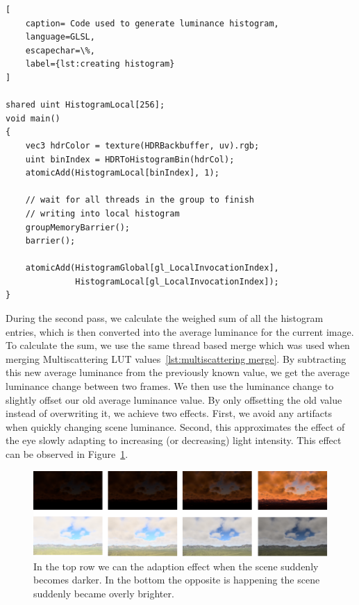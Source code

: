 \documentclass{ctuthesis}
\begin{document}
\begin{lstlisting}[ 
    caption= Code used to generate luminance histogram,
    language=GLSL,
    escapechar=\%,
    label={lst:creating histogram}
]

shared uint HistogramLocal[256];
void main()
{
    vec3 hdrColor = texture(HDRBackbuffer, uv).rgb;
    uint binIndex = HDRToHistogramBin(hdrCol);
    atomicAdd(HistogramLocal[binIndex], 1);

    // wait for all threads in the group to finish 
    // writing into local histogram
    groupMemoryBarrier();
    barrier();

    atomicAdd(HistogramGlobal[gl_LocalInvocationIndex],
              HistogramLocal[gl_LocalInvocationIndex]);
}
\end{lstlisting}

During the second pass, we calculate the weighed sum of all the histogram entries, which is then converted into 
the average luminance for the current image. To calculate the sum, we use the same thread based merge which 
was used when merging Multiscattering LUT values~\ref{lst:multiscattering merge}. By subtracting this new
average luminance from the previously known value, we get the average luminance change between two frames.
We then use the luminance change to slightly offset our old average luminance value. By only offsetting 
the old value instead of overwriting it, we achieve two effects. First, we avoid any artifacts when quickly 
changing scene luminance. Second, this approximates the effect of the eye slowly adapting to increasing (or 
decreasing) light intensity. This effect can be observed in Figure~\ref{fig:Eye luminance adaptation}.

\begin{figure}
        \includegraphics[width=1.0\textwidth]{media/Adaptive_lum_demonstration.png}
        \caption[Adaptive luminance effect]{In the top row we can the adaption effect when the scene suddenly becomes 
            darker. In the bottom the opposite is happening the scene suddenly became overly 
            brighter.}
        \label{fig:Eye luminance adaptation}
\end{figure}
\end{document}
